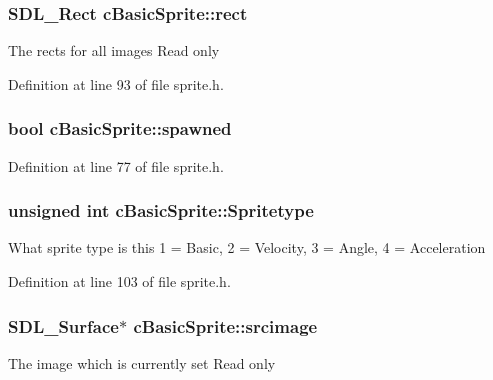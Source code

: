 \hypertarget{classc_basic_sprite_a6f5d45a0db04ae6c516f88ccd3ec83ad}{
\subsubsection[{rect}]{\setlength{\rightskip}{0pt plus 5cm}S\-D\-L\-\_\-\-Rect c\-Basic\-Sprite\-::rect}}\label{classc_basic_sprite_a6f5d45a0db04ae6c516f88ccd3ec83ad}
The rects for all images Read only 

Definition at line 93 of file sprite.\-h.

\hypertarget{classc_basic_sprite_ae82550ad1ec25aaf8b61e78afb3abc9d}{
\subsubsection[{spawned}]{\setlength{\rightskip}{0pt plus 5cm}bool c\-Basic\-Sprite\-::spawned}}\label{classc_basic_sprite_ae82550ad1ec25aaf8b61e78afb3abc9d}


Definition at line 77 of file sprite.\-h.

\hypertarget{classc_basic_sprite_a7bf47e784956a031db06a3f768b688f4}{
\subsubsection[{Spritetype}]{\setlength{\rightskip}{0pt plus 5cm}unsigned int c\-Basic\-Sprite\-::\-Spritetype}}\label{classc_basic_sprite_a7bf47e784956a031db06a3f768b688f4}
What sprite type is this 1 = Basic, 2 = Velocity, 3 = Angle, 4 = Acceleration 

Definition at line 103 of file sprite.\-h.

\hypertarget{classc_basic_sprite_afd756d967421277013a3af729860d434}{
\subsubsection[{srcimage}]{\setlength{\rightskip}{0pt plus 5cm}S\-D\-L\-\_\-\-Surface$\ast$ c\-Basic\-Sprite\-::srcimage}}\label{classc_basic_sprite_afd756d967421277013a3af729860d434}
The image which is currently set Read only 

